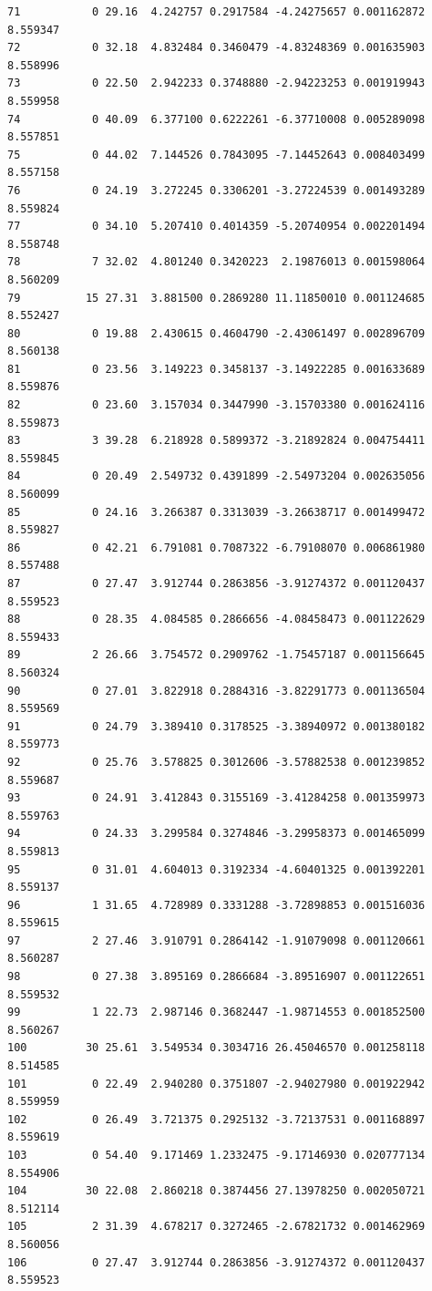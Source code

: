 \documentclass[]{book}
\theoremstyle{definition}
\theoremstyle{definition}
\theoremstyle{definition}
\theoremstyle{remark}
\begin{document}
\begin{verbatim}
71           0 29.16  4.242757 0.2917584 -4.24275657 0.001162872 8.559347
72           0 32.18  4.832484 0.3460479 -4.83248369 0.001635903 8.558996
73           0 22.50  2.942233 0.3748880 -2.94223253 0.001919943 8.559958
74           0 40.09  6.377100 0.6222261 -6.37710008 0.005289098 8.557851
75           0 44.02  7.144526 0.7843095 -7.14452643 0.008403499 8.557158
76           0 24.19  3.272245 0.3306201 -3.27224539 0.001493289 8.559824
77           0 34.10  5.207410 0.4014359 -5.20740954 0.002201494 8.558748
78           7 32.02  4.801240 0.3420223  2.19876013 0.001598064 8.560209
79          15 27.31  3.881500 0.2869280 11.11850010 0.001124685 8.552427
80           0 19.88  2.430615 0.4604790 -2.43061497 0.002896709 8.560138
81           0 23.56  3.149223 0.3458137 -3.14922285 0.001633689 8.559876
82           0 23.60  3.157034 0.3447990 -3.15703380 0.001624116 8.559873
83           3 39.28  6.218928 0.5899372 -3.21892824 0.004754411 8.559845
84           0 20.49  2.549732 0.4391899 -2.54973204 0.002635056 8.560099
85           0 24.16  3.266387 0.3313039 -3.26638717 0.001499472 8.559827
86           0 42.21  6.791081 0.7087322 -6.79108070 0.006861980 8.557488
87           0 27.47  3.912744 0.2863856 -3.91274372 0.001120437 8.559523
88           0 28.35  4.084585 0.2866656 -4.08458473 0.001122629 8.559433
89           2 26.66  3.754572 0.2909762 -1.75457187 0.001156645 8.560324
90           0 27.01  3.822918 0.2884316 -3.82291773 0.001136504 8.559569
91           0 24.79  3.389410 0.3178525 -3.38940972 0.001380182 8.559773
92           0 25.76  3.578825 0.3012606 -3.57882538 0.001239852 8.559687
93           0 24.91  3.412843 0.3155169 -3.41284258 0.001359973 8.559763
94           0 24.33  3.299584 0.3274846 -3.29958373 0.001465099 8.559813
95           0 31.01  4.604013 0.3192334 -4.60401325 0.001392201 8.559137
96           1 31.65  4.728989 0.3331288 -3.72898853 0.001516036 8.559615
97           2 27.46  3.910791 0.2864142 -1.91079098 0.001120661 8.560287
98           0 27.38  3.895169 0.2866684 -3.89516907 0.001122651 8.559532
99           1 22.73  2.987146 0.3682447 -1.98714553 0.001852500 8.560267
100         30 25.61  3.549534 0.3034716 26.45046570 0.001258118 8.514585
101          0 22.49  2.940280 0.3751807 -2.94027980 0.001922942 8.559959
102          0 26.49  3.721375 0.2925132 -3.72137531 0.001168897 8.559619
103          0 54.40  9.171469 1.2332475 -9.17146930 0.020777134 8.554906
104         30 22.08  2.860218 0.3874456 27.13978250 0.002050721 8.512114
105          2 31.39  4.678217 0.3272465 -2.67821732 0.001462969 8.560056
106          0 27.47  3.912744 0.2863856 -3.91274372 0.001120437 8.559523

\end{verbatim}
\end{document}
